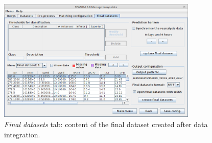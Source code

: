 \documentclass[energies,article,accept,moreauthors,pdftex]{Definitions/mdpi}
\begin{document}
\begin{figure}[H]
				\widefigure
				\includegraphics[width=0.85\textwidth]{figures/FigureFinal_datasets_EF.png}
				\caption{\textit{Final datasets} tab: content of the final dataset created after data integration.}\label{fig:final_dataset_EF}
			\end{figure}
\end{document}

